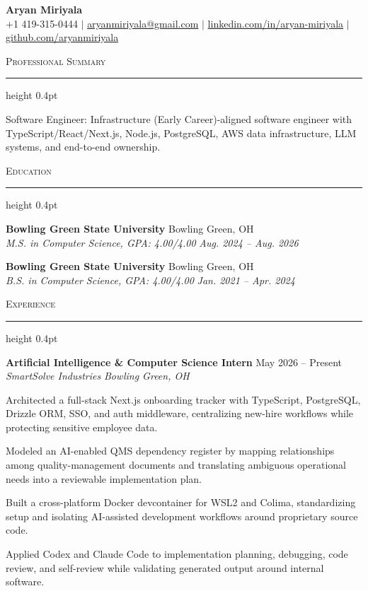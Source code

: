 \documentclass[letterpaper,11pt]{article}
\newcommand{\resumesection}[1]{%
  \par\vspace{2pt}%
  {\large\scshape #1}\par\vspace{2pt}%
  \hrule height 0.4pt\vspace{2pt}%
}
\newcommand{\resumeSubheading}[4]{
  \textbf{#1} \hfill #2\\
  \textit{#3} \hfill \textit{#4}
}
\begin{document}
\begin{center}
  {\LARGE \textbf{Aryan Miriyala}}\\[-1pt]
  \small
  +1 419-315-0444 $|$
  \href{mailto:aryanmiriyala@gmail.com}{aryanmiriyala@gmail.com} $|$
  \href{https://www.linkedin.com/in/aryan-miriyala-7788a21b6/}{linkedin.com/in/aryan-miriyala} $|$
  \href{https://github.com/aryanmiriyala}{github.com/aryanmiriyala}
\end{center}\vspace{-10pt}

\resumesection{Professional Summary}
Software Engineer: Infrastructure (Early Career)-aligned software engineer with TypeScript/React/Next.js, Node.js, PostgreSQL, AWS data infrastructure, LLM systems, and end-to-end ownership.

\resumesection{Education}
\resumeSubheading
{Bowling Green State University}{Bowling Green, OH}
{M.S. in Computer Science, GPA: 4.00/4.00}{Aug. 2024 -- Aug. 2026}

\resumeSubheading
{Bowling Green State University}{Bowling Green, OH}
{B.S. in Computer Science, GPA: 4.00/4.00}{Jan. 2021 -- Apr. 2024}

\resumesection{Experience}
\resumeSubheading
{Artificial Intelligence \& Computer Science Intern}{May 2026 -- Present}
{SmartSolve Industries}{Bowling Green, OH}
\begin{tightitemize}
  \item Architected a full-stack Next.js onboarding tracker with TypeScript, PostgreSQL, Drizzle ORM, SSO, and auth middleware, centralizing new-hire workflows while protecting sensitive employee data.
  \item Modeled an AI-enabled QMS dependency register by mapping relationships among quality-management documents and translating ambiguous operational needs into a reviewable implementation plan.
  \item Built a cross-platform Docker devcontainer for WSL2 and Colima, standardizing setup and isolating AI-assisted development workflows around proprietary source code.
  \item Applied Codex and Claude Code to implementation planning, debugging, code review, and self-review while validating generated output around internal software.
\end{tightitemize}
\end{document}
